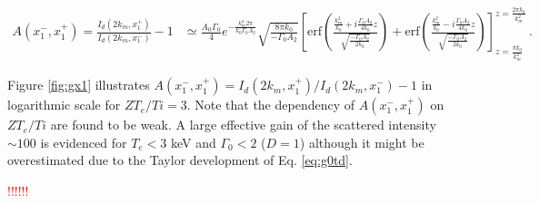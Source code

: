 \documentclass[
 reprint,
 amsmath,amssymb,
 aps,
]{revtex4-1}
\begin{document}
\begin{widetext}
\begin{align}
 A(x_1^-,x_1^+)=\frac{I_d(2k_m,x_1^+)}{I_d(2k_m,x_1^-)} - 1& \simeq 
\frac{A_0\Gamma_0}{4} e^{-\frac{k_m^4 2\pi}{k_0  \Gamma_0A_2}}\sqrt{\frac{8\pi k_0}{-\Gamma_0A_2}}
\left[ 
\mathrm{erf}\left(\frac{
\frac{ k_m^2}{k_0} +i\frac{ \Gamma_0 A_2}{4k_0} z }{\sqrt{\frac{-\Gamma_0A_2}{2 k_0}}} \right)
+\mathrm{erf}\left(\frac{
\frac{ k_m^2}{k_0} -i\frac{ \Gamma_0 A_2}{4k_0} z }{\sqrt{\frac{-\Gamma_0A_2}{2 k_0}}} \right)
\right]_{z= \frac{\pi k_0 }{k_m^2} }^{z= \frac{2\pi k_0 }{k_m^2} }
\, . \label{eq:idx01}
\end{align}
\end{widetext}
Figure \ref{fig:gx1} illustrates $A(x_1^-,x_1^+)=I_d(2k_m,x_1^+) / I_d(2k_m,x_1^-) - 1$ in logarithmic scale for $ZT_e/Ti=3$. Note that the dependency of $A(x_1^-,x_1^+)$ on $ZT_e/Ti$ are found to be weak.
A  large effective gain of the scattered intensity  $\sim 100$ is evidenced for  $T_e<3$ keV and $\Gamma_0<2$ ($D=1$) although it might be overestimated due to  the  Taylor development of Eq. \eqref{eq:g0td}.

\textcolor{red}{!!!!!!}


\end{document}
